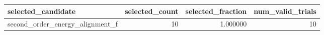 \begin{tabular}{lrrr}
\toprule
selected_candidate & selected_count & selected_fraction & num_valid_trials \\
\midrule
second_order_energy_alignment_f & 10 & 1.000000 & 10 \\
\bottomrule
\end{tabular}
